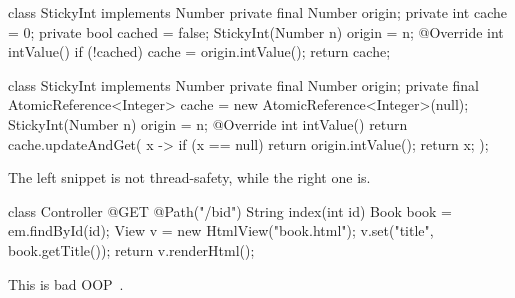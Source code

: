 \documentclass{article}
\begin{document}
\begin{pptWide}{2}
{\small\begin{ffcode}
class StickyInt implements Number {
  private final Number origin;
  private int cache = 0;
  private bool cached = false;
  StickyInt(Number n) { origin = n; }
  @Override int intValue() {
    if (!cached) {
      cache = origin.intValue();
    }
    return cache;
  }
}
\end{ffcode}
}
\par\columnbreak\par
{\scriptsize\begin{ffcode}
class StickyInt implements Number {
  private final Number origin;
  private final AtomicReference<Integer> cache =
    new AtomicReference<Integer>(null);
  StickyInt(Number n) { origin = n; }
  @Override int intValue() {
    return cache.updateAndGet(
      x -> {
        if (x == null) {
          return origin.intValue();
        }
        return x;
      }
    );
  }
}
\end{ffcode}
}
\end{pptWide}
\par
The left snippet is not thread-safety, while the right one is.
\plush{}


\begin{pptWide}{2}
{\small\begin{ffcode}
class Controller {
  @GET
  @Path("/b{id}")
  String index(int id) {
    Book book = em.findById(id);
    View v = new HtmlView("book.html");
    v.set("title", book.getTitle());
    return v.renderHtml();
  }
}
\end{ffcode}
}
\par\columnbreak\par
{}\par
This is bad OOP~\citep{bugayenko2016blog1213}.
\end{pptWide}
\par
\plush{}
\end{document}
